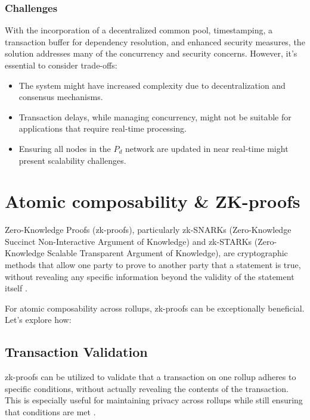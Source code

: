 \documentclass{article}
\begin{document}
\subsubsection{Challenges}

With the incorporation of a decentralized common pool, timestamping, a transaction buffer for dependency resolution, and enhanced security measures, the solution addresses many of the concurrency and security concerns. However, it's essential to consider trade-offs:

\begin{itemize}
    \item The system might have increased complexity due to decentralization and consensus mechanisms.
    \item Transaction delays, while managing concurrency, might not be suitable for applications that require real-time processing.
    \item Ensuring all nodes in the \( P_d \) network are updated in near real-time might present scalability challenges.
\end{itemize}
\section{Atomic composability \&
ZK-proofs}\label{atomic-composability-zk-proofs}

Zero-Knowledge Proofs (zk-proofs), particularly zk-SNARKs
(Zero-Knowledge Succinct Non-Interactive Argument of Knowledge) and
zk-STARKs (Zero-Knowledge Scalable Transparent Argument of Knowledge),
are cryptographic methods that allow one party to prove to another party
that a statement is true, without revealing any specific information
beyond the validity of the statement itself \cite{ben2013snarks, ben2018scalable}.

For atomic composability across rollups, zk-proofs can be exceptionally
beneficial. Let's explore how:

\subsection{Transaction Validation}\label{transaction-validation}

zk-proofs can be utilized to validate that a transaction on one rollup
adheres to specific conditions, without actually revealing the contents
of the transaction. This is especially useful for maintaining privacy
across rollups while still ensuring that conditions are met \cite{gennaro2013quadratic}.
\end{document}
